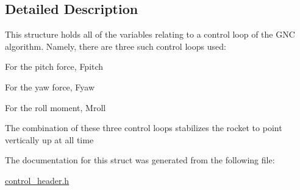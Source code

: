 \subsection{Detailed Description}
This structure holds all of the variables relating to a control loop of the G\-N\-C algorithm. Namely, there are three such control loops used\-:
\begin{DoxyItemize}
\item For the pitch force, Fpitch
\item For the yaw force, Fyaw
\item For the roll moment, Mroll
\end{DoxyItemize}

The combination of these three control loops stabilizes the rocket to point vertically up at all time 

The documentation for this struct was generated from the following file\-:\begin{DoxyCompactItemize}
\item 
\hyperlink{control__header_8h}{control\-\_\-header.\-h}\end{DoxyCompactItemize}
